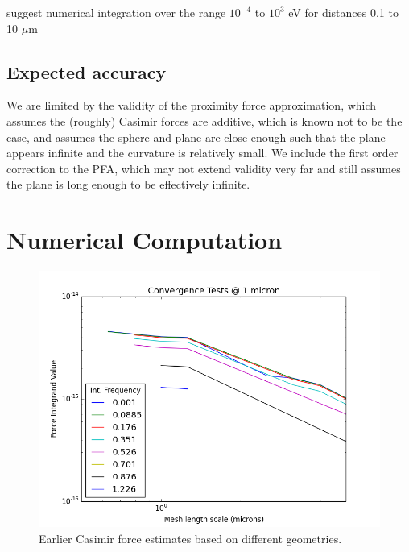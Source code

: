 \documentclass[11pt]{article}
\begin{document}
\citet{Lambrecht} suggest numerical integration over the range $10^{-4}$ to $10^{3}$ eV for distances 0.1 to 10 $\mu$m

\subsection{Expected accuracy}
We are limited by the validity of the proximity force approximation, which assumes the (roughly) Casimir forces are additive, which is known not to be the case, and assumes the sphere and plane are close enough such that the plane appears infinite and the curvature is relatively small. We include the first order correction to the PFA, which may not extend validity very far and still assumes the plane is long enough to be effectively infinite.

\section{Numerical Computation}

\begin{figure}[h]
\centering
\includegraphics[width=5.5in]{convergence}
\caption{Earlier Casimir force estimates based on different geometries.}\label{fig:conv1}
\end{figure}
\end{document}
